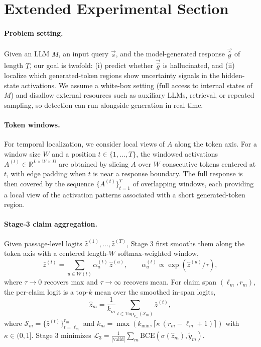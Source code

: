 \section{Extended Experimental Section}
\label{app:extended}

\paragraph{Problem setting.} Given an LLM $M$, an input query $\vec{s}$, and the model-generated response $\vec{\hat{g}}$ of length $T$, our goal is twofold: (i) predict whether $\vec{\hat{g}}$ is hallucinated, and (ii) localize which generated-token regions show uncertainty signals in the hidden-state activations. We assume a white-box setting (full access to internal states of $M$) and disallow external resources such as auxiliary LLMs, retrieval, or repeated sampling, so detection can run alongside generation in real time.

\paragraph{Token windows.} For temporal localization, we consider local views of $A$ along the token axis. For a window size $W$ and a position $t \in \{1, \dots, T\}$, the windowed activations $A^{(t)} \in \mathbb{R}^{L \times W \times D}$ are obtained by slicing $A$ over $W$ consecutive tokens centered at $t$, with edge padding when $t$ is near a response boundary. The full response is then covered by the sequence $\{A^{(t)}\}_{t=1}^{T}$ of overlapping windows, each providing a local view of the activation patterns associated with a short generated-token region.

\paragraph{Stage-3 claim aggregation.} Given passage-level logits
$\hat{z}^{(1)}, \ldots, \hat{z}^{(T)}$, Stage 3 first smooths them
along the token axis with a centered length-$W$ softmax-weighted
window,
\begin{equation}
\bar{z}^{(t)} = \!\!\!\!\!\sum_{u \in \mathcal{W}(t)}\!\!\!\! \alpha_u^{(t)}\, \hat{z}^{(u)},\qquad \alpha_u^{(t)} \propto \exp(\hat{z}^{(u)}/\tau),
\end{equation}
where $\tau \to 0$ recovers max and $\tau \to \infty$ recovers mean.
For claim span $(\ell_m,r_m)$, the per-claim logit is a top-$k$ mean
over the smoothed in-span logits,
\begin{equation}
\hat{z}_m = \frac{1}{k_m}\!\!\!\sum_{t \in \mathrm{Top}_{k_m}(\mathcal{S}_m)}\!\!\! \bar{z}^{(t)},
\end{equation}
where $\mathcal{S}_m = \{\bar{z}^{(t)}\}_{t=\ell_m}^{r_m}$ and
$k_m = \max(k_{\min}, \lceil \kappa\,(r_m - \ell_m + 1) \rceil)$ with
$\kappa \in (0, 1]$. Stage 3 minimizes
$\mathcal{L}_{3} = \tfrac{1}{|\mathrm{valid}|}\sum_m \mathrm{BCE}(\sigma(\hat{z}_m), \tilde{y}_m)$.


